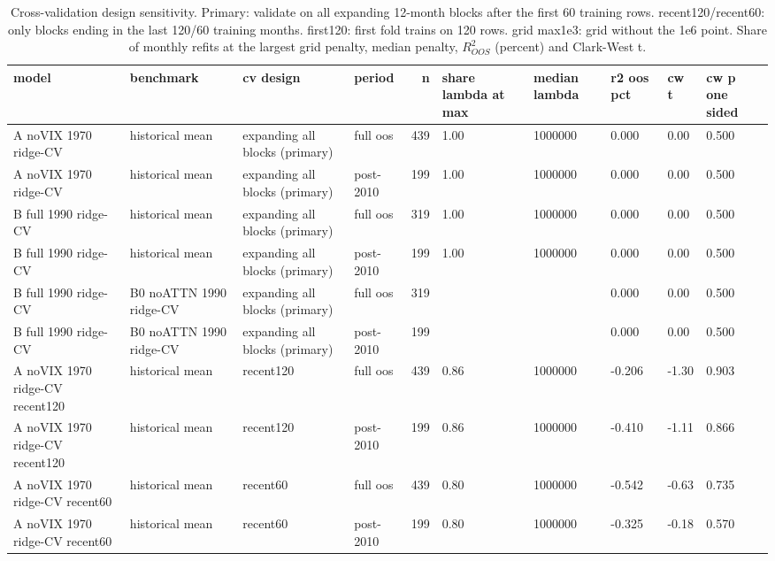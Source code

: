 \begin{table}[H]
\centering\small
\caption{Cross-validation design sensitivity. Primary: validate on all expanding 12-month blocks after the first 60 training rows. recent120/recent60: only blocks ending in the last 120/60 training months. first120: first fold trains on 120 rows. grid max1e3: grid without the 1e6 point. Share of monthly refits at the largest grid penalty, median penalty, $R^2_{OOS}$ (percent) and Clark-West t.}
\label{tab:m6_cv_design}
\begin{adjustbox}{max width=\linewidth}
\begin{tabular}{llllrlllll}
\toprule
model & benchmark & cv design & period & n & share lambda at max & median lambda & r2 oos pct & cw t & cw p one sided \\
\midrule
A noVIX 1970 ridge-CV & historical mean & expanding all blocks (primary) & full oos & 439 & 1.00 & 1000000 & 0.000 & 0.00 & 0.500 \\
A noVIX 1970 ridge-CV & historical mean & expanding all blocks (primary) & post-2010 & 199 & 1.00 & 1000000 & 0.000 & 0.00 & 0.500 \\
B full 1990 ridge-CV & historical mean & expanding all blocks (primary) & full oos & 319 & 1.00 & 1000000 & 0.000 & 0.00 & 0.500 \\
B full 1990 ridge-CV & historical mean & expanding all blocks (primary) & post-2010 & 199 & 1.00 & 1000000 & 0.000 & 0.00 & 0.500 \\
B full 1990 ridge-CV & B0 noATTN 1990 ridge-CV & expanding all blocks (primary) & full oos & 319 &  &  & 0.000 & 0.00 & 0.500 \\
B full 1990 ridge-CV & B0 noATTN 1990 ridge-CV & expanding all blocks (primary) & post-2010 & 199 &  &  & 0.000 & 0.00 & 0.500 \\
A noVIX 1970 ridge-CV recent120 & historical mean & recent120 & full oos & 439 & 0.86 & 1000000 & -0.206 & -1.30 & 0.903 \\
A noVIX 1970 ridge-CV recent120 & historical mean & recent120 & post-2010 & 199 & 0.86 & 1000000 & -0.410 & -1.11 & 0.866 \\
A noVIX 1970 ridge-CV recent60 & historical mean & recent60 & full oos & 439 & 0.80 & 1000000 & -0.542 & -0.63 & 0.735 \\
A noVIX 1970 ridge-CV recent60 & historical mean & recent60 & post-2010 & 199 & 0.80 & 1000000 & -0.325 & -0.18 & 0.570 \\

\end{tabular}
\end{adjustbox}
\end{table}
